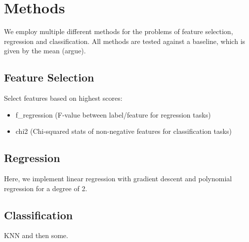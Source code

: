 \section{Methods}
\label{sec:two}

We employ multiple different methods for the problems of feature selection,
regression and classification.  All methods are tested against a baseline, which
is given by the mean (argue).

\subsection{Feature Selection}

Select features based on highest scores:

\begin{itemize}
\item f\_regression (F-value between label/feature for regression tasks)
\item chi2 (Chi-squared stats of non-negative features for classification tasks)
\end{itemize}

\subsection{Regression}

Here, we implement linear regression with gradient descent and polynomial
regression for a degree of 2.

\subsection{Classification}

KNN and then some.

